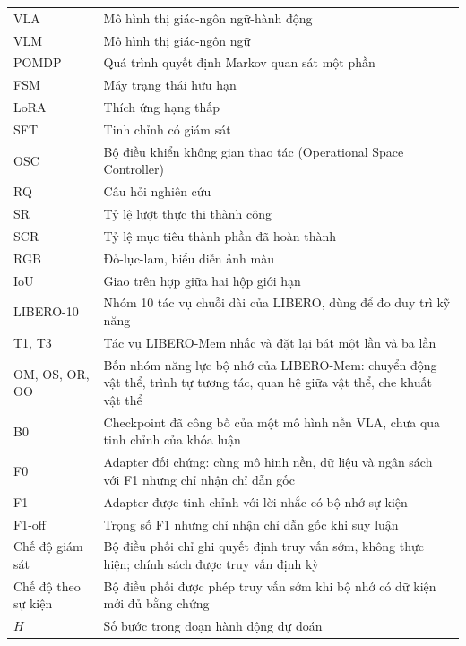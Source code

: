 \documentclass[fontsize=13pt,paper=a4,DIV=calc,oneside,open=any,headings=normal,numbers=noenddot]{scrbook}
\begin{document}

\pagestyle{empty}



\frontmatter
\pagestyle{scrheadings}
\tableofcontents
\listoffigures
\listoftables
{}
\begin{longtable}{p{}p{}}
VLA & Mô hình thị giác-ngôn ngữ-hành động\\
VLM & Mô hình thị giác-ngôn ngữ\\
POMDP & Quá trình quyết định Markov quan sát một phần\\
FSM & Máy trạng thái hữu hạn\\
LoRA & Thích ứng hạng thấp\\
SFT & Tinh chỉnh có giám sát\\
OSC & Bộ điều khiển không gian thao tác (Operational Space Controller)\\
RQ & Câu hỏi nghiên cứu\\
SR & Tỷ lệ lượt thực thi thành công\\
SCR & Tỷ lệ mục tiêu thành phần đã hoàn thành\\
RGB & Đỏ-lục-lam, biểu diễn ảnh màu\\
IoU & Giao trên hợp giữa hai hộp giới hạn\\
LIBERO-10 & Nhóm 10 tác vụ chuỗi dài của LIBERO, dùng để đo duy trì kỹ năng\\
T1, T3 & Tác vụ LIBERO-Mem nhấc và đặt lại bát một lần và ba lần\\
OM, OS, OR, OO & Bốn nhóm năng lực bộ nhớ của LIBERO-Mem: chuyển động vật thể, trình tự tương tác, quan hệ giữa vật thể, che khuất vật thể\\
B0 & Checkpoint đã công bố của một mô hình nền VLA, chưa qua tinh chỉnh của khóa luận\\
F0 & Adapter đối chứng: cùng mô hình nền, dữ liệu và ngân sách với F1 nhưng chỉ nhận chỉ dẫn gốc\\
F1 & Adapter được tinh chỉnh với lời nhắc có bộ nhớ sự kiện\\
F1-off & Trọng số F1 nhưng chỉ nhận chỉ dẫn gốc khi suy luận\\
Chế độ giám sát & Bộ điều phối chỉ ghi quyết định truy vấn sớm, không thực hiện; chính sách được truy vấn định kỳ\\
Chế độ theo sự kiện & Bộ điều phối được phép truy vấn sớm khi bộ nhớ có dữ kiện mới đủ bằng chứng\\
$H$ & Số bước trong đoạn hành động dự đoán\\

\end{longtable}
\end{document}
